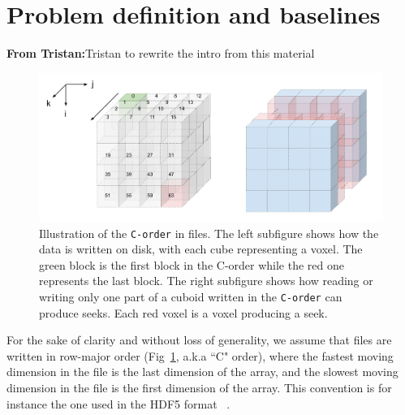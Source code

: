 \documentclass[sigconf, nonacm]{acmart}
\newcommand{\tristan}[1]{\color{orange}\textbf{From Tristan:}#1\color{black}}
\begin{document}



\section{Problem definition and baselines}\tristan{Tristan to rewrite the intro from this material}

\begin{figure}[h]
  \centering
  \includegraphics[scale=0.35]{./figures/new/figure_1.png}
  \caption{Illustration of the \texttt{C-order} in files. The left subfigure
  shows how the data is written on disk, with each cube representing a voxel.
  The green block is the first block in the C-order while the red one represents the last block.
  The right subfigure shows how reading or writing only one part of a cuboid written
  in the \texttt{C-order} can produce seeks. Each red voxel is a voxel producing a seek.}
  \label{fig:seeks_and_rowmajor}
\end{figure}

For the sake of clarity and without loss of generality, we assume that
 files are written in row-major order (Fig~\ref{fig:seeks_and_rowmajor},
 a.k.a ``C" order), where the fastest moving dimension in the file is the
 last dimension of the array, and the slowest moving dimension in the file
 is the first dimension of the array. This convention is for instance the
 one used in the HDF5 format ~\cite{hdf5}. 
\end{document}
